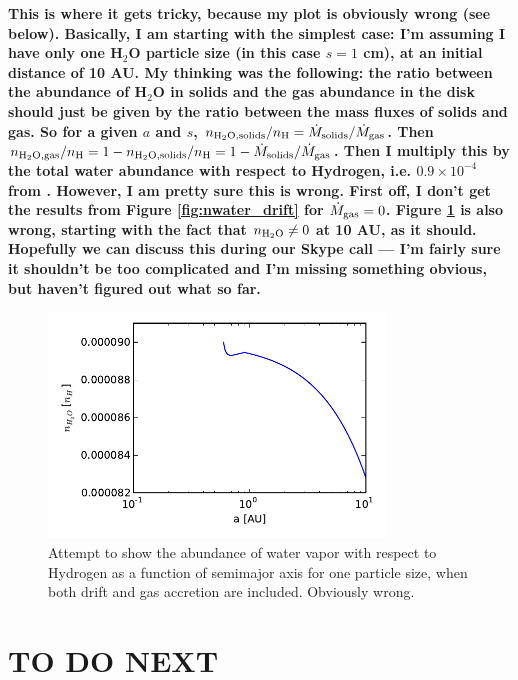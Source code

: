 \documentclass[12pt, preprint]{aastex}
\begin{document}
\textbf{This is where it gets tricky, because my plot is obviously wrong (see below). Basically, I am starting with the simplest case: I'm assuming I have only one H$_2$O particle size (in this case $s=1$ cm), at an initial distance of 10 AU. My thinking was the following: the ratio between the abundance of H$_2$O in solids and the gas abundance in the disk should just be given by the ratio between the mass fluxes of solids and gas. So for a given $a$ and $s$, $n_{\rm H_2 O, solids}/n_{\rm H} = \dot{M}_{\rm solids}/\dot{M}_{\rm gas}$. Then $n_{\rm H_2 O, gas}/n_{\rm H} = 1-n_{\rm H_2 O, solids}/n_{\rm H}=1-\dot{M}_{\rm solids}/\dot{M}_{\rm gas}$. Then I multiply this by the total water abundance with respect to Hydrogen, i.e. $0.9 \times 10^{-4}$ from \citet{oberg11}. However, I am pretty sure this is wrong. First off, I don't get the results from Figure \ref{fig:nwater_drift} for $\dot{M}_{\rm gas}=0$. Figure \ref{fig:wrong} is also wrong, starting with the fact that $n_{\rm H_2 O} \neq 0$ at 10 AU, as it should. Hopefully we can discuss this during our Skype call --- I'm fairly sure it shouldn't be too complicated and I'm missing something obvious, but haven't figured out what so far.}

\begin{figure}[htb]
\centering
\includegraphics[width=0.8\textwidth]{figs/nH2O_acc_wrong.pdf}
\caption{Attempt to show the abundance of water vapor with respect to Hydrogen as a function of semimajor axis for one particle size, when both drift and gas accretion are included. Obviously wrong.} %
\label{fig:wrong}
\end{figure}


\section{TO DO NEXT}
\end{document}
